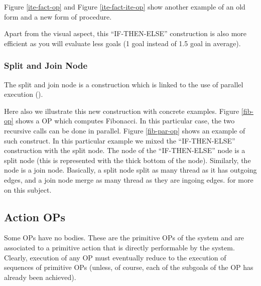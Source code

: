 
Figure \ref{ite-fact-op} and Figure \ref{ite-fact-ite-op} show another example
of an old form and a new form of procedure.

Apart from the visual aspect, this ``IF-THEN-ELSE'' construction is also more
efficient as you will evaluate less goals (1 goal instead of 1.5 goal in average).

\subsubsection{Split and Join Node}

The split and join node is a construction which is linked to the use of
parallel execution ().



Here also we illustrate this new construction with concrete examples.
Figure \ref{fib-op} shows a OP which computes Fibonacci. In this particular
case, the two recursive calls can be done in parallel. Figure \ref{fib-par-op}
shows an example of such construct. In this particular example we mixed the
``IF-THEN-ELSE'' construction with the split node. The  node of the
 ``IF-THEN-ELSE'' node is a split node (this is represented with the
thick bottom of the node). Similarly, the  node is a join node.
Basically, a split node split as many thread as it has outgoing edges, and a
join node merge as many thread as they are ingoing edges.  for more on this subject.

\subsection{Action OPs}

Some OPs have no bodies.  These are the primitive OPs of the system and
are associated to a primitive action that is directly
performable by the system.  Clearly, execution of any OP must eventually
reduce to the execution of sequences of primitive OPs (unless, of
course, each of the subgoals of the OP has already been achieved).

